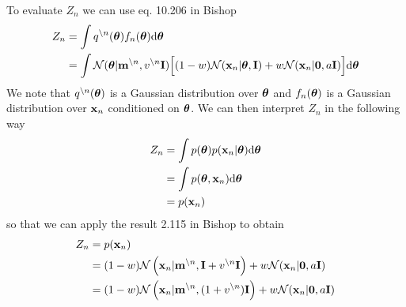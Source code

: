 \documentclass{amsmlaj}
\begin{document}
\begin{extraproblem}
\begin{sol}
	To evaluate $Z_n$ we can use eq. 10.206 in Bishop
	\begin{align}
		Z_n&=\int q^{\setminus n}(\bm{\mathbf{\theta}}) f_n(\bm{\mathbf{\theta}}) \mathrm{d}\bm{\mathbf{\theta}} \\
		&=\int \mathcal{N}(\bm{\mathbf{\theta}}|\bm{\mathbf{m}}^{\setminus n},v^{\setminus n}\bm{\mathbf{I}})
		\Big[
			(1-w)\mathcal{N}(\bm{\mathbf{x}}_n|\bm{\mathbf{\theta}},\bm{\mathbf{I}})
			+w\mathcal{N}(\bm{\mathbf{x}}_n|\bm{\mathbf{0}},a\bm{\mathbf{I}})
		\Big] \mathrm{d}\bm{\mathbf{\theta}}
	\end{align}
	We note that $q^{\setminus n}(\bm{\mathbf{\theta}})$ is a Gaussian distribution over
	$\bm{\mathbf{\theta}}$ and $f_n(\bm{\mathbf{\theta}})$ is a Gaussian distribution over
	$\bm{\mathbf{x}}_n$ conditioned on $\bm{\mathbf{\theta}}$. We can then interpret $Z_n$ in the
	following way
	\begin{align}
		Z_n&=\int p(\bm{\mathbf{\theta}})p(\bm{\mathbf{x}}_n|\bm{\mathbf{\theta}}) \mathrm{d}\bm{\mathbf{\theta}} \\
		&=\int p(\bm{\mathbf{\theta}},\bm{\mathbf{x}}_n) \mathrm{d}\bm{\mathbf{\theta}} \\
		&= p(\bm{\mathbf{x}}_n)
	\end{align}
	so that we can apply the result 2.115 in Bishop to obtain
	\begin{align}
		Z_n&=p(\bm{\mathbf{x}}_n) \\
		&=(1-w)\mathcal{N}\left(\bm{\mathbf{x}}_n|\bm{\mathbf{m}}^{\setminus n},\bm{\mathbf{I}}+v^{\setminus n}\bm{\mathbf{I}}\right)
		+w\mathcal{N}(\bm{\mathbf{x}}_n|\bm{\mathbf{0}},a\bm{\mathbf{I}}) \\
		&=(1-w)\mathcal{N}\left(\bm{\mathbf{x}}_n|\bm{\mathbf{m}}^{\setminus n},(1+v^{\setminus n})\bm{\mathbf{I}}\right)
		+w\mathcal{N}(\bm{\mathbf{x}}_n|\bm{\mathbf{0}},a\bm{\mathbf{I}})
	\end{align}
\end{sol}

\end{extraproblem}
\end{document}
